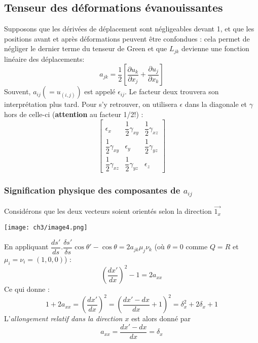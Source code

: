     \subsection{Tenseur des déformations évanouissantes}
    Supposons que les dérivées de déplacement sont négligeables devant 1, et que les positions 
    avant et après déformations peuvent être confondues : cela permet de négliger le dernier 
    terme du tenseur de Green et que $L_{jk}$ devienne une fonction linéaire des déplacements:
    \begin{equation}
    a_{jk} = \frac{1}{2}\left[\dfrac{\partial u_k}{\partial x_j}+
    \dfrac{\partial u_j}{\partial x_k}\right]
    \end{equation}
    Souvent, $a_{ij} (= u_{(i,j)})$ est appelé $\epsilon_{ij}$. Le facteur deux trouvera son 
    interprétation plus tard. Pour s'y retrouver, on utilisera $\epsilon$ dans la diagonale et
    $\gamma$ hors de celle-ci (\textbf{attention} au facteur 1/2!) :
    \begin{equation}
    \left[\begin{array}{ccc}
    \epsilon_x & \dfrac{1}{2}\gamma_{xy} & \dfrac{1}{2}\gamma_{xz}\\
    \dfrac{1}{2}\gamma_{xy} & \epsilon_{y} & \dfrac{1}{2}\gamma_{yz}\\
    \dfrac{1}{2}\gamma_{xz} & \dfrac{1}{2}\gamma_{yz} & \epsilon_{z}
    \end{array}\right]
    \end{equation}
    
        \subsubsection{Signification physique des composantes de $a_{ij}$}
        Considérons que les deux vecteurs soient orientés selon la direction $\vec{1_x}$
        \begin{center}
        \texttt{[image: ch3/image4.png]}
        \end{center}
        
        En appliquant $\dfrac{ds'}{ds}.\dfrac{\delta s'}{\delta s}\cos\theta' - \cos\theta
        = 2a_{jk}\mu_j\nu_k$ (où $\theta = 0$ comme $Q=R$ et $\mu_i = \nu_i = (1,0,0)$) :
        \begin{equation}
        \left(\dfrac{dx'}{dx}\right)^2 - 1 = 2a_{xx}
        \end{equation}
        Ce qui donne :
        \begin{equation}
        1 + 2a_{xx} = \left(\dfrac{dx'}{dx}\right)^2 = \left(\dfrac{dx'-dx}{dx}+1\right)^2
        = \delta_x^2 + 2\delta_x + 1
        \end{equation}
        L'\textit{allongement relatif dans la direction $x$} est alors donné par 
        \begin{equation}
        a_{xx} = \dfrac{dx'-dx}{dx} = \delta_x
        \end{equation}
        
